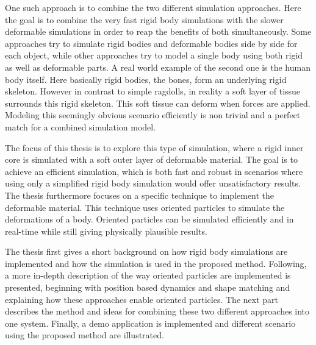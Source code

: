One such approach is to combine the two different simulation approaches. Here the goal is to combine the very fast rigid body simulations with the slower deformable simulations in order to reap the benefits of both simultaneously. Some approaches try to simulate rigid bodies and deformable bodies side by side for each object, while other approaches try to model a single body using both rigid as well as deformable parts. A real world example of the second one is the human body itself. Here basically rigid bodies, the bones, form an underlying rigid skeleton. However in contrast to simple ragdolls, in reality a soft layer of tissue surrounds this rigid skeleton. This soft tissue can deform when forces are applied. Modeling this seemingly obvious scenario efficiently is non trivial and a perfect match for a combined simulation model.

The focus of this thesis is to explore this type of simulation, where a rigid inner core is simulated with a soft outer layer of deformable material. The goal is to achieve an efficient simulation, which is both fast and robust in scenarios where using only a simplified rigid body simulation would offer unsatisfactory results. The thesis furthermore focuses on a specific technique to implement the deformable material. This technique uses oriented particles to simulate the deformations of a body. Oriented particles can be simulated efficiently and in real-time while still giving physically plausible results.

The thesis first gives a short background on how rigid body simulations are implemented and how the simulation is used in the proposed method. Following, a more in-depth description of the way oriented particles are implemented is presented, beginning with position based dynamics and shape matching and explaining how these approaches enable oriented particles. The next part describes the method and ideas for combining these two different approaches into one system. Finally, a demo application is implemented and different scenario using the proposed method are illustrated.
